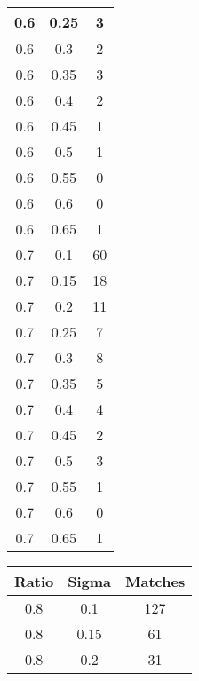 \documentclass[12pt,letterpaper, onecolumn]{exam}
\begin{document}
\begin{questions}
\begin{solution}
\begin{center}
\begin{tabular}{|c|c|c|}
                \hline
                0.6 & 0.25 & 3 \\
                \hline
                0.6 & 0.3 & 2 \\
                \hline
                0.6 & 0.35 & 3 \\
                \hline
                0.6 & 0.4 & 2 \\
                \hline
                0.6 & 0.45 & 1 \\
                \hline
                0.6 & 0.5 & 1 \\
                \hline
                0.6 & 0.55 & 0 \\
                \hline
                0.6 & 0.6 & 0 \\
                \hline
                0.6 & 0.65 & 1 \\
                \hline
                0.7 & 0.1 & 60 \\
                \hline
                0.7 & 0.15 & 18 \\
                \hline
                0.7 & 0.2 & 11 \\
                \hline
                0.7 & 0.25 & 7 \\
                \hline
                0.7 & 0.3 & 8 \\
                \hline
                0.7 & 0.35 & 5 \\
                \hline
                0.7 & 0.4 & 4 \\
                \hline
                0.7 & 0.45 & 2 \\
                \hline
                0.7 & 0.5 & 3 \\
                \hline
                0.7 & 0.55 & 1 \\
                \hline
                0.7 & 0.6 & 0 \\
                \hline
                0.7 & 0.65 & 1 \\
                \hline
            \end{tabular}
            \quad
            \begin{tabular}{|c|c|c|}
                \hline
                \textbf{Ratio} & \textbf{Sigma} & \textbf{Matches} \\
                \hline
                0.8 & 0.1 & 127 \\
                \hline
                0.8 & 0.15 & 61 \\
                \hline
                0.8 & 0.2 & 31 \\

\end{tabular}
\end{center}
\end{solution}
\end{questions}
\end{document}
